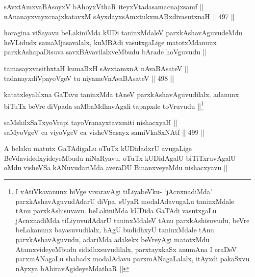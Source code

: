 
\begin{shl}
sAvxtAmxvaBAsoyxV bAhoyxV\s thaR iteyxVtadasamacnajxsamf ||  \\
nAnanayxvayxcnajxkatavxM sAyxdayxsAmxtukxmABxdivasutxnaH ||  497 || 
\end{shl}

\begin{artha}
horagina viSayavu beLakiniMda kUDi taninxMdaleV parxkAshavAguvudeMdu heVLidudx samaMjasavalalx, kuMBAdi vasutxgaLige matotxMdanunx parxkAshapaDisuva savxBAvavilalxveMbudu bArade hoVguvudu ||
\end{artha}


\begin{shl}
tamasayxvasithxtaH kumaBxH sAvxtamxnA nAvaBAsateV || \\
tadanayxdiVpayoVgeV tu niyameVnAvaBAsateV ||  498 ||  
\end{shl}

\begin{artha}
katatxleyalilxna GaTavu taninxMda tAneV parxkAshavAguvudilalx, adanunx biTuTx beVre diVpada saMbaMdhavAgali tapapxde toVruvudu ||\footnote{I vAtiVkavanunx hiVge vivaravAgi tiLiyabeVku- `jAcnxnadiMda' parxkAshavAguvudAdarU diVpa, sUyaR modalAdavugaLu taninxMdale tAnu parxkAshisuvavu. beLakiniMda kUDida GaTAdi vasutxgaLu jAcnxnadiMda tiLiyuvudAdarU taninxMdaleV tAnu parxkAshisuvudu, beVre beLakanunx bayasuvudilalx, hAgU budidhxyU taninxMdale tAnu parxkAshavAguvudu, adariMda adakekx beVreyAgi matotxMdu AtamxvideyeMbudu sididhxsuvudilalx, parxtayxkaSx anumAna I eraDeV parxmANagaLu shabadx modalAdavu parxmANagaLalalx, itAyxdi pakaSxvu nAyxya bAhiravAgideyeMdathaR ||}
\end{artha}


\begin{shl}
saMshilxSaTxyoVrapi tayoVranayxtavxmiti nishacxyaH || \\
saMyoVgeV ca viyoVgeV ca visheVSasayx samiVkaSxNAtf ||  499 ||  
\end{shl}

\begin{artha}
A belaku matutx GaTAdigaLu oTuTx kUDidadxrU avugaLige BeVdavidedxyideyeMbudu niNaRyavu, oTuTx kUDidAgalU biTiTxruvAgalU oMdu visheVSa kANuvudariMda averaDU BinanxveyeMdu nishacxyavu ||
\end{artha}

